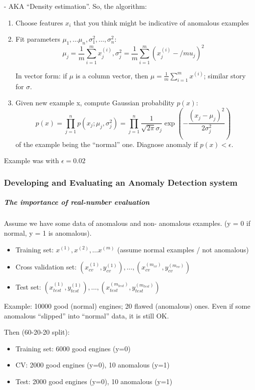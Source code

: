 \documentclass{scrartcl}
\begin{document}
- AKA ``Density estimation''. So, the algorithm:
\begin{enumerate}
\item Choose features $x_i$ that you think might be indicative of
  anomalous examples
\item Fit parameters $\mu_1, \dots \mu_n, \sigma_1^2, \dots,
  \sigma_n^2$:
  \[ \mu_j = \frac{1}{m} \sum \limits_{i=1}^m x_j^{(i)}, \sigma_j^2 =
  \frac{1}{m} \sum \limits_{i=1}^m (x_j^{(i)} - /mu_j)^2\]

  In vector form: if $\mu$ is a column vector, then $\mu = \frac{1}{m}
  \sum \limits_{i=1}^m x^{(i)}$; similar story for $\sigma$.
\item Given new example x, compute Gaussian probability $p(x)$:
  \[p(x) = \prod \limits_{j=1}^n p(x_j;\mu_j, \sigma_j^2) = \prod
  \limits_{j=1}^n \frac{1}{\sqrt{2 \pi} \sigma_j} \exp(-\frac{(x_j -
    \mu_j)^2}{2\sigma_j^2}) \] of the example being the ``normal''
  one. Diagnose anomaly if $p(x) < \epsilon$.
\end{enumerate}

Example was with $\epsilon = 0.02$

\subsubsection{Developing and Evaluating an Anomaly Detection system}
\label{sec:15-4}

\subparagraph{The importance of real-number evaluation}

Assume we have some data of anomalous and non- anomalous examples. (y
= 0 if normal, y = 1 is anomalous).
\begin{itemize}
\item Training set: $x^{(1)},x^{(2)}, \dots x^{(m)}$ (assume normal
  examples / not anomalous)
\item Cross validation set: $(x_{cv}^{(1)}, y_{cv}^{(1)}), \dots,
  (x_{cv}^{(m_{cv})}, y_{cv}^{(m_{cv})})$
\item Test set: $(x_{test}^{(1)}, y_{test}^{(1)}), \dots,
  (x_{test}^{(m_{test})}, y_{test}^{(m_{test})})$
\end{itemize}
Example: 10000 good (normal) engines; 20 flawed (anomalous) ones. Even
if some anomalous ``slipped'' into ``normal'' data, it is still OK.

Then (60-20-20 split):
\begin{itemize}
\item Training set: 6000 good engines (y=0)
\item CV: 2000 good engines (y=0), 10 anomalous (y=1)
\item Test: 2000 good engines (y=0), 10 anomalous (y=1)
\end{itemize}
\end{document}
